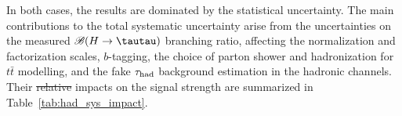 \documentclass[PAPER, coverpage, atlasdraft=true, texlive=2016, UKenglish]{\ATLASLATEXPATH atlasdoc}
\providecommand{\DIFadd}[1]{{\protect\color{blue}\uwave{#1}}} %
\providecommand{\DIFdel}[1]{{\protect\color{red}\sout{#1}}}                      %
\providecommand{\DIFaddbegin}{} %
\providecommand{\DIFaddend}{} %
\providecommand{\DIFdelbegin}{} %
\providecommand{\DIFdelend}{} %
\begin{document}
In both cases, the results are dominated by the statistical uncertainty.
The main contributions to the total systematic uncertainty arise from the uncertainties on the measured $\BR(H\to \tautau)$ branching ratio,
affecting the normalization and factorization scales, $b$-tagging, the choice of parton shower and hadronization for $t\bar t$ modelling, and the fake $\tau_{\mathrm{had}}$ background estimation in the hadronic channels. Their \DIFdelbegin \DIFdel{relative }\DIFdelend \DIFaddbegin \DIFadd{absolute }\DIFaddend impacts on the signal strength are summarized in Table~\ref{tab:had_sys_impact}.
\end{document}

